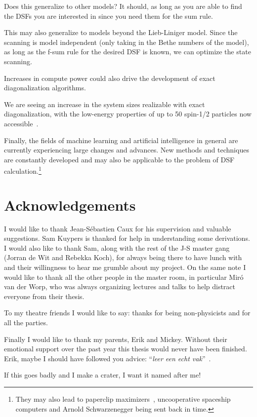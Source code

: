 \documentclass[11pt, a4paper]{report} %
\begin{document}
Does this generalize to other models? It should, as long as you are able to find the DSFs you are interested in since you need them for the sum rule.

This may also generalize to models beyond the Lieb-Liniger model.
Since the scanning is model independent (only taking in the Bethe numbers of the model), as long as the f-sum rule for the desired DSF is known, we can optimize the state scanning.

Increases in compute power could also drive the development of exact diagonalization algorithms.

We are seeing an increase in the system sizes realizable with exact diagonalization, with the low-energy properties of up to 50 spin-1/2 particles now accessible~\cite{wietek18_sublat_codin_algor_distr_memor}.

Finally, the fields of machine learning and artificial intelligence in general are currently experiencing large changes and advances.
New methods and techniques are constantly developed and may also be applicable to the problem of DSF calculation.\footnote{They may also lead to paperclip maximizers~\cite{tegmark}, uncooperative spaceship computers and Arnold Schwarzenegger being sent back in time.}

\section{Acknowledgements}
I would like to thank Jean-Sébastien Caux for his supervision and valuable suggestions.
Sam Kuypers is thanked for help in understanding some derivations.
I would also like to thank Sam, along with the rest of the J-S master gang (Jorran de Wit and Rebekka Koch), for always being there to have lunch with and their willingness to hear me grumble about my project.
On the same note I would like to thank all the other people in the master room, in particular Miró van der Worp, who was always organizing lectures and talks to help distract everyone from their thesis.

To my theatre friends I would like to say: thanks for being non-physicists and for all the parties.

Finally I would like to thank my parents, Erik and Mickey.
Without their emotional support over the past year this thesis would never have been finished.
Erik, maybe I should have followed you advice: ``\textit{leer een echt vak}''~\cite{erik}.

\appendix

\begin{savequote}[50mm]
If this goes badly and I make a crater, I want it named after me!
\end{savequote}
\end{document}
